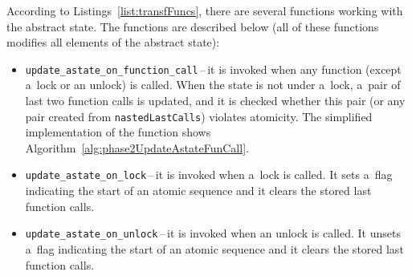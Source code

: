 According to Listings~\ref{list:transfFuncs}, there are several functions
working with the abstract state. The functions are described below
(all of these functions modifies all elements of the abstract state):
\begin{itemize}
    \item
        \texttt{update\_astate\_on\_function\_call}\,--\,it is invoked
        when any function (except a~lock or an unlock) is called.
        When the state is not under a~lock, a~pair of last two function
        calls is updated, and it is checked whether this pair (or any
        pair created from \texttt{nastedLastCalls}) violates atomicity.
        The simplified implementation of the function shows
        Algorithm~\ref{alg:phase2UpdateAstateFunCall}.

    \item
        \texttt{update\_astate\_on\_lock}\,--\,it is invoked when a~lock
        is called. It sets a~flag indicating the start of an atomic sequence
        and it clears the stored last function calls.

    \item
        \texttt{update\_astate\_on\_unlock}\,--\,it is invoked when an
        unlock is called. It unsets a~flag indicating the start of an atomic
        sequence and it clears the stored last function calls.
\end{itemize}

\begin{algorithm}[hbt]



    \caption{%
        Simplified updating of the abstract state with a~called function
        and checking of atomicity violation
    }
    \label{alg:phase2UpdateAstateFunCall}
\end{algorithm}

